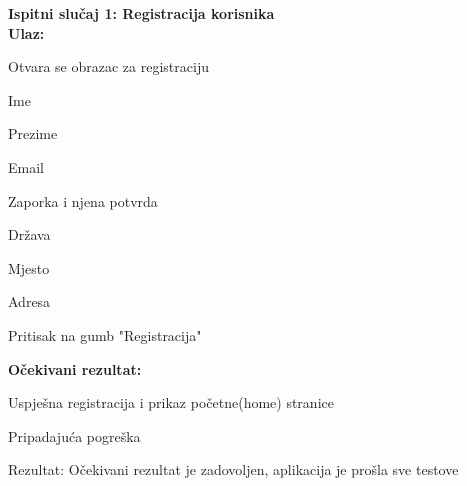			 \noindent \textbf{Ispitni slučaj 1: Registracija korisnika}\\
			 \medskip
            \noindent\textbf{Ulaz:}
            \begin{packed_enum}
            \item Otvara se obrazac za registraciju
            \item Ime
            \item Prezime
            \item Email
            \item Zaporka i njena potvrda
            \item Država
            \item Mjesto
            \item Adresa
            \item Pritisak na gumb "Registracija"
            \end{packed_enum}
            
            \noindent\textbf{Očekivani rezultat:}
            \begin{packed_enum}
            \item Uspješna registracija i prikaz početne(home) stranice
            \item Pripadajuća pogreška
            \end{packed_enum}
            
            \noindent \text
            Rezultat: Očekivani rezultat je zadovoljen, aplikacija je prošla sve testove \\  
            
